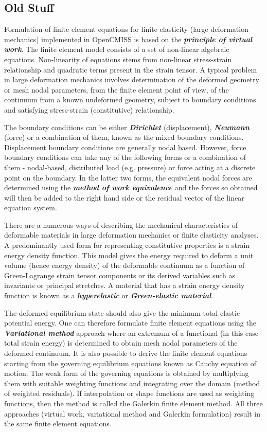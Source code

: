 \clearpage

\subsection{Old Stuff}

Formulation of finite element equations for finite elasticity (large
deformation mechanics) implemented in OpenCMISS is based on the
\textit{\textbf{principle of virtual work}}. The finite element model consists
of a set of non-linear algebraic equations. Non-linearity of equations stems
from non-linear stress-strain relationship and quadratic terms present in the
strain tensor. A typical problem in large deformation mechanics involves
determination of the deformed geometry or mesh nodal parameters, from the
finite element point of view, of the continuum from a known undeformed
geometry, subject to boundary conditions and satisfying stress-strain
(constitutive) relationship.
  
The boundary conditions can be either \textit{\textbf{Dirichlet}}
(displacement), \textit{\textbf{Neumann}} (force) or a combination of them,
known as the mixed boundary conditions. Displacement boundary conditions are
generally nodal based. However, force boundary conditions can take any of the
following forms or a combination of them - nodal-based, distributed load
(e.g. pressure) or force acting at a discrete point on the boundary. In the
latter two forms, the equivalent nodal forces are determined using the
\textit{\textbf{method of work equivalence}} \cite{hutton:2004} and the forces
so obtained will then be added to the right hand side or the residual vector
of the linear equation system.

There are a numerous ways of describing the mechanical characteristics of
deformable materials in large deformation mechanics or finite elasticity
analyses. A predominantly used form for representing constitutive properties
is a strain energy density function. This model gives the energy required to
deform a unit volume (hence energy density) of the deformable continuum as a
function of Green-Lagrange strain tensor components or its derived variables
such as invariants or principal stretches. A material that has a strain energy
density function is known as a \textit{\textbf{hyperelastic}} or
\textit{\textbf{Green-elastic material}}.

The deformed equilibrium state should also give the minimum total elastic
potential energy. One can therefore formulate finite element equations using
the \textit{\textbf{Variational method}} approach where an extremum of a
functional (in this case total strain energy) is determined to obtain mesh
nodal parameters of the deformed continuum. It is also possible to derive the
finite element equations starting from the governing equilibrium equations
known as Cauchy equation of motion. The weak form of the governing equations
is obtained by multiplying them with suitable weighting functions and
integrating over the domain (method of weighted residuals). If interpolation
or shape functions are used as weighting functions, then the method is called
the Galerkin finite element method. All three approaches (virtual work,
variational method and Galerkin formulation) result in the same finite element
equations.

